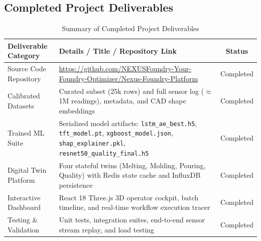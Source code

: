 \documentclass[11pt, a4paper]{article}
\begin{document}
\subsection{Completed Project Deliverables}
\begin{table}[H]
    \centering
    \footnotesize
    \renewcommand{\arraystretch}{1.2}
    \begin{tabular}{|p{4.2cm}|p{7.5cm}|c|}
        \hline
        \textbf{Deliverable Category} & \textbf{Details / Title / Repository Link} & \textbf{Status} \\
        \hline
        Source Code Repository & \url{https://github.com/NEXUSFoundry-Your-Foundry-Optimizer/Nexus-Foundry-Platform} & Completed \\
        \hline
        Calibrated Datasets & Curated subset (25k rows) and full sensor log ($\approx$1M readings), metadata, and CAD shape embeddings & Completed \\
        \hline
        Trained ML Suite & Serialized model artifacts: \texttt{lstm\_ae\_best.h5}, \texttt{tft\_model.pt}, \texttt{xgboost\_model.json}, \texttt{shap\_explainer.pkl}, \texttt{resnet50\_quality\_final.h5} & Completed \\
        \hline
        Digital Twin Platform & Four stateful twins (Melting, Molding, Pouring, Quality) with Redis state cache and InfluxDB persistence & Completed \\
        \hline
        Interactive Dashboard & React 18 Three.js 3D operator cockpit, batch timeline, and real-time workflow execution tracer & Completed \\
        \hline
        Testing \& Validation & Unit tests, integration suites, end-to-end sensor stream replay, and load testing & Completed \\
        \hline
    \end{tabular}
    \caption{Summary of Completed Project Deliverables}
    \label{tab:project-deliverables}
\end{table}
\end{document}
